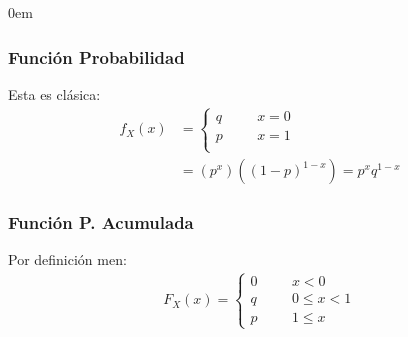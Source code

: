 \documentclass[12pt, fleqn]{report}                             %
\newenvironment{SmallIndentation}[1][0.75em]                    %
        {\begin{adjustwidth}{#1}{}\begin{footnotesize}}             %
        {\end{footnotesize}\end{adjustwidth}}                       %
\newcommand \ForceColumnBreak {\vfill\null\columnbreak}         %
\DeclareMathOperator \Space {\quad}                             %
\theoremstyle{break}                                            %
\begin{document}
\begin{multicols}{2}
\begin{SmallIndentation}[0em]
                
                    \ForceColumnBreak

                    \subsubsection{Función Probabilidad}

                        Esta es clásica:
                        \begin{align*}
                            f_X(x) 
                                &= 
                                \begin{cases}
                                    q \Space& x = 0                     \\
                                    p \Space& x = 1                     \\
                                \end{cases}                             \\
                                &= (p^x) ((1-p)^{1-x}) = p^x q^{1-x}
                        \end{align*}


                    \subsubsection{Función P. Acumulada}

                        Por definición men:
                        \begin{align*}
                            F_X(x) = 
                                \begin{cases}
                                    0 \Space& x < 0             \\
                                    q \Space& 0 \leq x < 1      \\
                                    p \Space& 1 \leq x 
                                \end{cases}
                        \end{align*}



\end{SmallIndentation}
\end{multicols}
\end{document}
